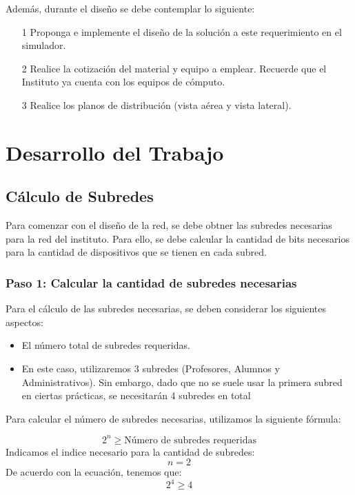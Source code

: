 Además, durante el diseño se debe contemplar lo siguiente:

\begin{enumerate}
    \item [1] Proponga e implemente el diseño de la solución a este requerimiento en el simulador.
    \item [2] Realice la cotización del material y equipo a emplear. Recuerde que el Instituto ya cuenta con los equipos de cómputo.
    \item [3] Realice los planos de distribución (vista aérea y vista lateral).
\end{enumerate}

\section{Desarrollo del Trabajo}

    \subsection{Cálculo de Subredes}

    Para comenzar con el diseño de la red, se debe obtner las subredes necesarias para la red del instituto. Para ello, se debe calcular la cantidad de bits necesarios para la cantidad de dispositivos que se tienen en cada subred.

    \subsubsection*{Paso 1: Calcular la cantidad de subredes necesarias}

    Para el cálculo de las subredes necesarias, se deben considerar los siguientes aspectos:
    \begin{itemize}
        \item El número total de subredes requeridas.
        \item En este caso, utilizaremos 3 subredes (Profesores, Alumnos y Administrativos). Sin embargo, dado que no se suele usar la primera subred en ciertas prácticas, se necesitarán 4 subredes en total
    \end{itemize}
    Para calcular el número de subredes necesarias, utilizamos la siguiente fórmula:

    \begin{equation} 
        2^{n} \geq \text{Número de subredes requeridas} 
    \label{eq:subredes} 
    \end{equation}
    Indicamos el indice necesario para la cantidad de subredes:
    \begin{equation} 
        n = 2 \label{eq:nsub} 
    \end{equation}
    De acuerdo con la ecuación, tenemos que:
    \begin{equation} 
        2^{4} \geq 4 \label{eq:numeroseb} 
    \end{equation}

